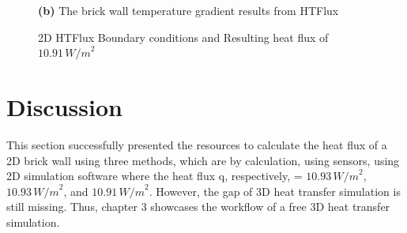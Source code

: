 \begin{figure}[tbh]
\begin{minipage}{0.45\textwidth}
  \caption*{\textbf{(b)} The brick wall temperature gradient results from HTFlux}
\end{minipage}
\caption{2D HTFlux Boundary conditions and Resulting heat flux of \( 10.91 \, {W/m}^2 \)}
\label{2dconst}
\end{figure}


\section{Discussion}
This section successfully presented the resources to calculate the heat flux of a 2D brick wall using three methods, which are by calculation, using sensors, using 2D simulation software where the heat flux q, respectively, = \( 10.93 \, {W/m}^2 \), \( 10.93 \, {W/m}^2 \), and \( 10.91 \, {W/m}^2 \). However, the gap of 3D heat transfer simulation is still missing. Thus, chapter 3 showcases the workflow of a free 3D heat transfer simulation.